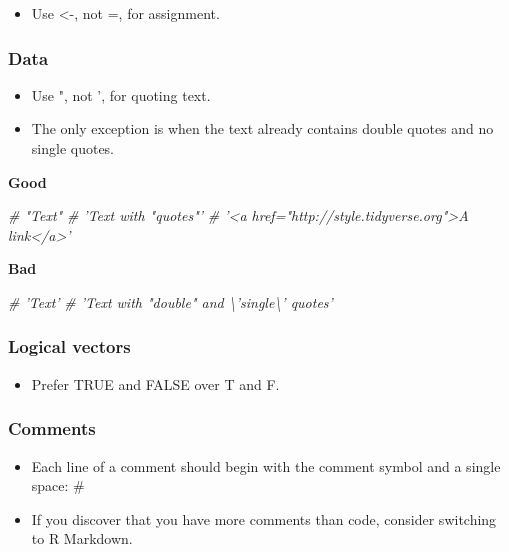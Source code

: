 \documentclass[
]{article}
\newenvironment{Shaded}{\begin{snugshade}}{\end{snugshade}}
\newcommand{\CommentTok}[1]{\textcolor[rgb]{0.56,0.35,0.01}{\textit{#1}}}
\providecommand{\tightlist}{%
  \setlength{\itemsep}{0pt}\setlength{\parskip}{0pt}}
\begin{document}
\begin{itemize}
\tightlist
\item
  Use \textless-, not =, for assignment.
\end{itemize}

\hypertarget{data}{%
\subsubsection{Data}\label{data}}

\begin{itemize}
\tightlist
\item
  Use ", not ', for quoting text.
\item
  The only exception is when the text already contains double quotes and
  no single quotes.
\end{itemize}

\textbf{Good}

\begin{Shaded}
\begin{Highlighting}[]
\CommentTok{# "Text"}
\CommentTok{# 'Text with "quotes"'}
\CommentTok{# '<a href="http://style.tidyverse.org">A link</a>'}
\end{Highlighting}
\end{Shaded}

\textbf{Bad}

\begin{Shaded}
\begin{Highlighting}[]
\CommentTok{# 'Text'}
\CommentTok{# 'Text with "double" and \textbackslash{}'single\textbackslash{}' quotes'}
\end{Highlighting}
\end{Shaded}

\hypertarget{logical-vectors}{%
\subsubsection{Logical vectors}\label{logical-vectors}}

\begin{itemize}
\tightlist
\item
  Prefer TRUE and FALSE over T and F.
\end{itemize}

\hypertarget{comments}{%
\subsubsection{Comments}\label{comments}}

\begin{itemize}
\tightlist
\item
  Each line of a comment should begin with the comment symbol and a
  single space: \#
\item
  If you discover that you have more comments than code, consider
  switching to R Markdown.
\end{itemize}
\end{document}
